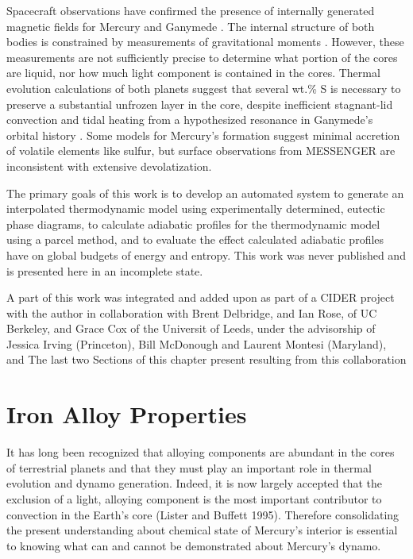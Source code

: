 Spacecraft observations have confirmed the presence of internally generated
magnetic fields for Mercury \cite{anderson11} and Ganymede \cite{kivelson96}.
The internal structure of both bodies is constrained by measurements of
gravitational moments \cite{smith12,hauck06}. However, these measurements are
not sufficiently precise to determine what portion of the cores are liquid, nor
how much light component is contained in the cores. Thermal evolution
calculations of both planets \cite{hauck04,hauck06,breuer07,bland08} suggest
that several wt.\% S is necessary to preserve a substantial unfrozen layer in
the core, despite inefficient stagnant-lid convection
\cite{solomatov00,hauck04,breuer07} and tidal heating from a hypothesized
resonance in Ganymede's orbital history \cite{showman97,bland08}. Some models
for Mercury's formation suggest minimal accretion of volatile elements like
sulfur, but surface observations from MESSENGER \cite{nittler11,mccubbin12} are
inconsistent with extensive devolatization.

The primary goals of this work is to develop an automated system to generate an
interpolated thermodynamic model using experimentally determined, eutectic
phase diagrams, to calculate adiabatic profiles for the thermodynamic model
using a parcel method, and to evaluate the effect calculated adiabatic profiles
have on global budgets of energy and entropy. This work was never published and
is presented here in an incomplete state.

A part of this work was integrated and added upon as part of a CIDER project with
the author in collaboration with Brent Delbridge, and Ian Rose, of UC Berkeley, and Grace Cox of the Universit of Leeds, under the advisorship of Jessica Irving (Princeton), Bill McDonough and Laurent Montesi (Maryland), and  
The last two Sections of this chapter present resulting from this collaboration

\section{Iron Alloy Properties}

It has long been recognized that alloying components are abundant in the cores
of terrestrial planets and that they must play an important role in thermal
evolution and dynamo generation. Indeed, it is now largely accepted that the
exclusion of a light, alloying component is the most important contributor to
convection in the Earth’s core (Lister and Buffett 1995). Therefore
consolidating the present understanding about chemical state of Mercury’s
interior is essential to knowing what can and cannot be demonstrated about
Mercury’s dynamo.

